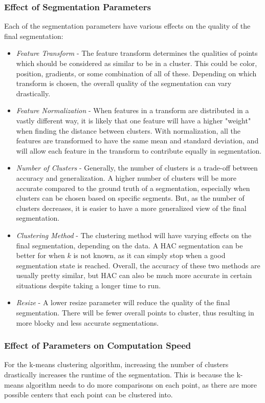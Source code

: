 \documentclass[12pt]{article}
\begin{document}
\subsubsection{Effect of Segmentation Parameters}
Each of the segmentation parameters have various effects on the quality of the final segmentation:
\begin{itemize}
	\item \textit{Feature Transform} - 	The feature transform determines the qualities of points which should be considered as similar to be in a cluster. This could be color, position, gradients, or some combination of all of these. Depending on which transform is chosen, the overall quality of the segmentation can vary drastically.
	\item \textit{Feature Normalization} - When features in a transform are distributed in a vastly different way, it is likely that one feature will have a higher "weight" when finding the distance between clusters. With normalization, all the features are transformed to have the same mean and standard deviation, and will allow each feature in the transform to contribute equally in segmentation.
	\item \textit{Number of Clusters} - Generally, the number of clusters is a trade-off between accuracy and generalization. A higher number of clusters will be more accurate compared to the ground truth of a segmentation, especially when clusters can be chosen based on specific segments. But, as the number of clusters decreases, it is easier to have a more generalized view of the final segmentation.
	\item \textit{Clustering Method} - The clustering method will have varying effects on the final segmentation, depending on the data. A HAC segmentation can be better for when $k$ is not known, as it can simply stop when a good segmentation state is reached. Overall, the accuracy of these two methods are usually pretty similar, but HAC can also be much more accurate in certain situations despite taking a longer time to run.
	\item \textit{Resize} - A lower resize parameter will reduce the quality of the final segmentation. There will be fewer overall points to cluster, thus resulting in more blocky and less accurate segmentations.
\end{itemize}

\subsubsection{Effect of Parameters on Computation Speed}
For the k-means clustering algorithm, increasing the number of clusters drastically increases the runtime of the segmentation. This is because the k-means algorithm needs to do more comparisons on each point, as there are more possible centers that each point can be clustered into.
\end{document}
